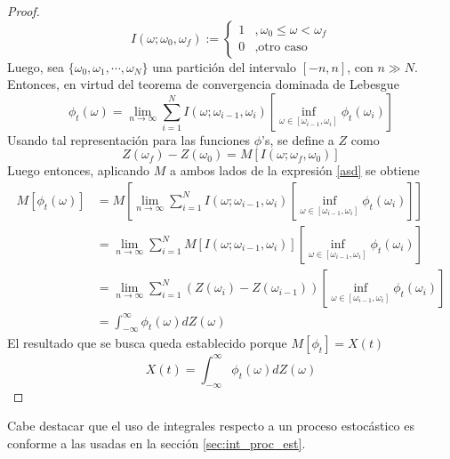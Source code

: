 \documentclass[12pt,letterpaper]{book}
\newcommand{\intR}{\int_{-\infty}^{\infty}}
\begin{document}
\begin{proof}
\begin{equation}
I(\omega; \omega_0, \omega_f) := \begin{cases}
1 &, \omega_0 \leq \omega < \omega_f \\
0 &, \text{otro caso}
\end{cases}
\end{equation}
Luego, sea $\{\omega_0, \omega_1, \cdots, \omega_N\}$ una partición del intervalo $[-n,n]$, con $n\gg N$. Entonces, en virtud del teorema de convergencia dominada de Lebesgue
\begin{equation}
\phi_t(\omega) = \lim_{n\rightarrow\infty} \sum_{i=1}^{N} I(\omega; \omega_{i-1}, \omega_i) \left[  \inf_{\omega \in [\omega_{i-1},\omega_i]} \phi_t(\omega_{i})\right]
\label{asd}
\end{equation}
Usando tal representación para las funciones $\phi$'s, se define a $Z$ como
\begin{equation}
Z(\omega_f) - Z(\omega_0) = M\left[ I(\omega; \omega_f, \omega_0) \right]
\end{equation}
Luego entonces, aplicando $M$ a ambos lados de la expresión \ref{asd} se obtiene
\begin{align*}
M\left[ \phi_t(\omega) \right] &= M\left[ \lim_{n\rightarrow\infty} \sum_{i=1}^{N} I(\omega; \omega_{i-1}, \omega_i) \left[  \inf_{\omega \in [\omega_{i-1},\omega_i]} \phi_t(\omega_{i})\right] \right] \\
&= \lim_{n\rightarrow\infty} \sum_{i=1}^{N} M\left[I(\omega; \omega_{i-1}, \omega_i) \right] \left[  \inf_{\omega \in [\omega_{i-1},\omega_i]} \phi_t(\omega_{i})\right] \\
&= \lim_{n\rightarrow\infty} \sum_{i=1}^{N} \left( Z(\omega_i) - Z(\omega_{i-1})\right) \left[  \inf_{\omega \in [\omega_{i-1},\omega_i]} \phi_t(\omega_{i})\right] \\
&= \intR \phi_t(\omega) dZ(\omega)
\end{align*}
El resultado que se busca queda establecido porque $M[\phi_t] = X(t)$
\begin{equation}
X(t) = \intR \phi_t(\omega) dZ(\omega)
\end{equation}
\end{proof}

%
Cabe destacar que el uso de integrales respecto a un proceso estocástico
es conforme 
a las usadas
en la sección \ref{sec:int_proc_est}.
\end{document}
